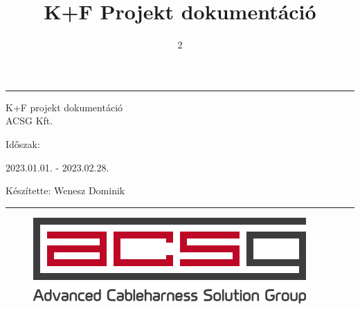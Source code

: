\documentclass{article}
\title{K+F Projekt dokumentáció}
\author{}
\date{2}
\begin{document}

\begin{center}
    \hrule
    \vspace{0.5cm}
    \begin{Huge}
    K+F projekt dokumentáció\\
    ACSG Kft.\\
    \end{Huge}
    \vspace{0.5cm}
    \begin{huge}
    Időszak:\\
    \end{huge}
    \begin{Large}
    2023.01.01. - 2023.02.28.\\
    \end{Large} \vspace{10pt}
    \begin{large}
    Készítette: Wenesz Dominik\\
    \end{large}\vspace{0.5cm}
    \hrule
    
  \end{center}
  \begin{figure}[b]
    \centering
    \includegraphics[]{acsg.png}
\end{figure}
  


\thispagestyle{empty}
\setcounter{page}{0}




\newpage
\tableofcontents
\newpage
\end{document}
